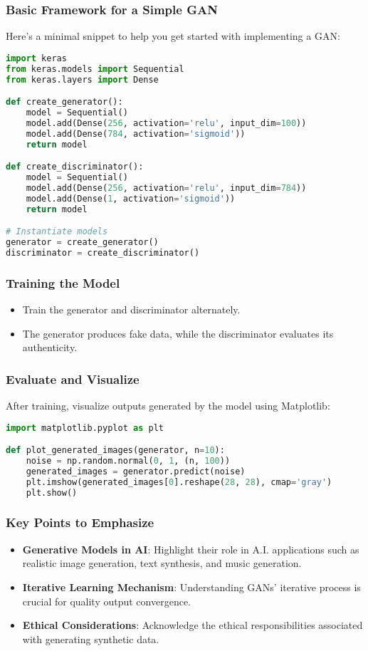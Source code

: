 \documentclass[aspectratio=169]{beamer}
\begin{document}
\begin{frame}[fragile]
    \frametitle{Basic Framework for a Simple GAN}
    Here's a minimal snippet to help you get started with implementing a GAN:
    \begin{lstlisting}[language=Python]
import keras
from keras.models import Sequential
from keras.layers import Dense

def create_generator():
    model = Sequential()
    model.add(Dense(256, activation='relu', input_dim=100))
    model.add(Dense(784, activation='sigmoid'))
    return model

def create_discriminator():
    model = Sequential()
    model.add(Dense(256, activation='relu', input_dim=784))
    model.add(Dense(1, activation='sigmoid'))
    return model

# Instantiate models
generator = create_generator()
discriminator = create_discriminator()
    \end{lstlisting}
\end{frame}

\begin{frame}
    \frametitle{Training the Model}
    \begin{itemize}
        \item Train the generator and discriminator alternately.
        \item The generator produces fake data, while the discriminator evaluates its authenticity.
    \end{itemize}
\end{frame}

\begin{frame}[fragile]
    \frametitle{Evaluate and Visualize}
    After training, visualize outputs generated by the model using Matplotlib:
    \begin{lstlisting}[language=Python]
import matplotlib.pyplot as plt

def plot_generated_images(generator, n=10):
    noise = np.random.normal(0, 1, (n, 100))
    generated_images = generator.predict(noise)
    plt.imshow(generated_images[0].reshape(28, 28), cmap='gray')
    plt.show()
    \end{lstlisting}
\end{frame}

\begin{frame}
    \frametitle{Key Points to Emphasize}
    \begin{itemize}
        \item \textbf{Generative Models in AI}: Highlight their role in A.I. applications such as realistic image generation, text synthesis, and music generation.
        \item \textbf{Iterative Learning Mechanism}: Understanding GANs' iterative process is crucial for quality output convergence.
        \item \textbf{Ethical Considerations}: Acknowledge the ethical responsibilities associated with generating synthetic data.
    \end{itemize}
\end{frame}
\end{document}
